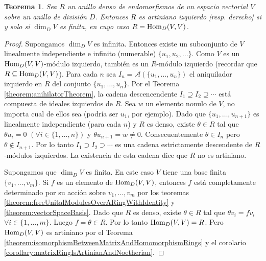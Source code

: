 \documentclass{report}
\newcommand{\Hom}{\textnormal{Hom}}
\newtheorem{theorem}{Teorema}
\begin{document}
  \begin{theorem}
    \label{theorem:leftArtinianDenseEndomorphismRingsOfVectorSpaces}
    Sea \(R\) un anillo denso de endomorfismos de un espacio vectorial \(V\) sobre un anillo de división \(D\).
    Entonces \(R\) es artiniano izquierdo [resp. derecho] si y solo si \(\dim_D V\) es finita, en cuyo caso \(R = \Hom_D(V, V)\).
  \end{theorem}
  \begin{proof}
    Supongamos \(\dim_D V\) es infinita.
    Entonces existe un subconjunto de \(V\) linealmente independiente e infinito (numerable) \(\{u_1, u_2, \dots\}\).
    Como \(V\) es un \(\Hom_D(V, V)\)-módulo izquierdo, también es un \(R\)-módulo izquierdo (recordar que \(R \subseteq \Hom_D(V, V)\)).
    Para cada \(n\) sea \(I_n = \mathcal{A}(\{u_1, \dots, u_n\})\) el aniquilador izquierdo en \(R\) del conjunto \(\{u_1, \dots, u_n\}\).
    Por el Teorema \ref{theorem:anihilatorTheorem}, la cadena descencendente \(I_1 \supseteq I_2 \supseteq \cdots\) está compuesta de ideales izquierdos de \(R\).
    Sea \(w\) un elemento nonulo de \(V\), no importa cual de ellos sea (podría ser \(u_1\), por ejemplo).
    Dado que \(\{u_1, \dots, u_{n + 1}\}\) es linealmente independiente (para cada \(n\)) y \(R\) es denso, existe \(\theta \in R\) tal que \(\theta u_i = 0\) \((\forall i \in \{1, \dots, n\})\) y \(\theta u_{n + 1} = w \neq 0\).
    Consecuentemente \(\theta \in I_n\) pero \(\theta \notin I_{n + 1}\).
    Por lo tanto \(I_1 \supset I_2 \supset \cdots\) es una cadena estrictamente descendente de \(R\)-módulos izquierdos.
    La existencia de esta cadena dice que \(R\) no es artiniano.

    Supongamos que \(\dim_D V\) es finita.
    En este caso \(V\) tiene una base finita \(\{v_1, \dots, v_m\}\).
    Si \(f\) es un elemento de \(\Hom_D(V, V)\), entonces \(f\) está completamente determinado por su acción sobre \(v_1, \dots, v_m\) por los teoremas \ref{theorem:freeUnitalModulesOverARingWithIdentity} y \ref{theorem:vectorSpaceBasis}.
    Dado que \(R\) es denso, existe \(\theta \in R\) tal que \(\theta v_i = f v_i\) \(\forall i \in \{1, \dots, m\}\).
    Luego \(f = \theta \in R\).
    Por lo tanto \(\Hom_D(V, V) = R\).
    Pero \(\Hom_D(V, V)\) es artiniano por el Teorema \ref{theorem:isomorphismBetweenMatrixAndHomomorphismRings} y el corolario \ref{corollary:matrixRingIsArtinianAndNoetherian}.
  \end{proof}
\end{document}
